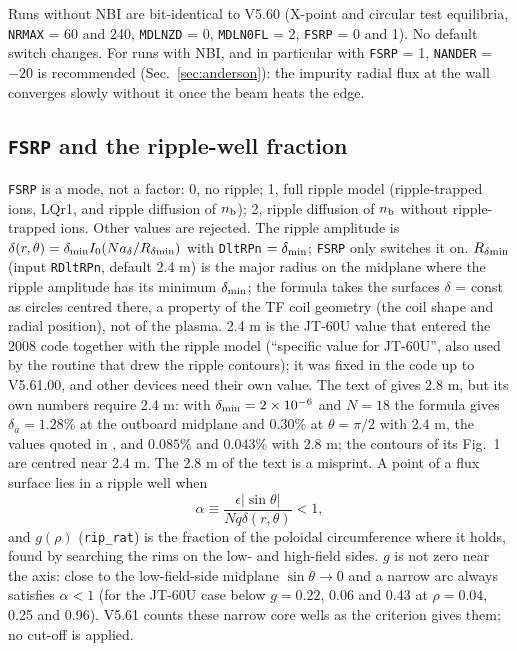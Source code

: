 \documentclass[11pt]{article}
\def\r#1{{\rm#1}}
\def\nb{n_\r{b}}
\begin{document}
Runs without NBI are bit-identical to V5.60 (X-point and circular test
equilibria, \texttt{NRMAX} = 60 and 240, \texttt{MDLNZD} = 0, \texttt{MDLN0FL} = 2,
\texttt{FSRP} = 0 and 1).  No default switch changes.  For runs with NBI, and in
particular with \texttt{FSRP} = 1, \texttt{NANDER} = $-20$ is recommended
(Sec.~\ref{sec:anderson}): the impurity radial flux at the wall converges slowly
without it once the beam heats the edge.

\subsection{\texttt{FSRP} and the ripple-well fraction}

\texttt{FSRP} is a mode, not a factor: 0, no ripple; 1, full ripple model
(ripple-trapped ions, LQr1, and ripple diffusion of $\nb$); 2, ripple diffusion
of $\nb$ without ripple-trapped ions.  Other values are rejected.  The ripple
amplitude is $\delta(r,\theta) = \delta_\r{min} I_0(N a_\delta/R_{\delta\r{min}})$
with \texttt{DltRPn} $=\delta_\r{min}$; \texttt{FSRP} only switches it on.
$R_{\delta\r{min}}$ (input \texttt{RDltRPn}, default 2.4 m) is the major radius on the
midplane where the ripple amplitude has its minimum $\delta_\r{min}$; the formula takes
the surfaces $\delta$ = const as circles centred there, a property of the TF coil
geometry (the coil shape and radial position), not of the plasma.  2.4 m is the JT-60U
value that entered the 2008 code together with the ripple model (``specific value for
JT-60U'', also used by the routine that drew the ripple contours); it was fixed in the
code up to V5.61.00, and other devices need their own value.  The text of \cite{NF2008}
gives 2.8 m, but
its own numbers require 2.4 m: with $\delta_\r{min} = 2\times10^{-6}$ and $N = 18$ the
formula gives $\delta_a = 1.28$\% at the outboard midplane and $0.30$\% at
$\theta = \pi/2$ with 2.4 m, the values quoted in \cite{NF2008}, and $0.085$\% and
$0.043$\% with 2.8 m; the contours of its Fig.~1 are centred near 2.4 m.  The 2.8 m of
the text is a misprint.  A point
of a flux surface lies in a ripple well when
\begin{equation}
  \alpha \equiv \frac{\epsilon|\sin\theta|}{Nq\delta(r,\theta)} < 1,
\end{equation}
and $g(\rho)$ (\texttt{rip\_rat}) is the fraction of the poloidal circumference where
it holds, found by searching the rims on the low- and high-field sides.
$g$ is not zero near the axis: close to the low-field-side midplane
$\sin\theta\to0$ and a narrow arc always satisfies $\alpha<1$ (for the JT-60U
case below $g = 0.22$, 0.06 and 0.43 at $\rho = 0.04$, 0.25 and 0.96).  V5.61
counts these narrow core wells as the criterion gives them; no cut-off is applied.
\end{document}
